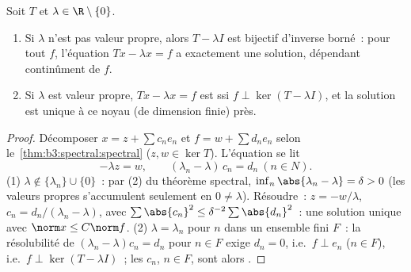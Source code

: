 \begin{theorem}
\label{thm:b3:spectral:fredholm}
Soit $T$   et $\lambda \in \R\setminus
\{0\}$.
\begin{enumerate}
  \item Si $\lambda$ n'est pas valeur propre, alors $T -
        \lambda I$ est bijectif d'inverse borné~: pour tout
        $f$, l'équation $Tx - \lambda x = f$ a exactement une
        solution, dépendant continûment de $f$.
  \item Si $\lambda$ est valeur propre, $Tx - \lambda x = f$
        est  ssi $f \perp \ker(T - \lambda I)$, et
        la solution est unique à ce noyau (de dimension
        finie) près.
\end{enumerate}
\end{theorem}

\begin{proof}
Décomposer $x = z + \sum c_ne_n$ et $f = w + \sum d_ne_n$
selon le~\cref{thm:b3:spectral:spectral} ($z, w \in \ker T$).
L'équation se lit
\[
-\lambda z = w, \qquad (\lambda_n - \lambda)\,c_n = d_n\
(n \in N).
\]
(1) $\lambda \notin \{\lambda_n\}\cup\{0\}$~: par (2) du
théorème spectral, $\inf_n\abs{\lambda_n - \lambda} = \delta
> 0$ (les valeurs propres s'accumulent seulement en $0 \neq
\lambda$). Résoudre~: $z = -w/\lambda$, $c_n =
d_n/(\lambda_n - \lambda)$, avec $\sum\abs{c_n}^2 \leq
\delta^{-2}\sum\abs{d_n}^2$~: une solution unique avec $\norm
x \leq C\norm f$.
(2) $\lambda = \lambda_{n}$ pour $n$ dans un ensemble fini
$F$~: la résolubilité de $(\lambda_n - \lambda)c_n = d_n$
pour $n \in F$ exige $d_n = 0$, i.e.\ $f \perp e_n$ ($n \in
F$), i.e.\ $f \perp \ker(T - \lambda I)$~; les $c_n$, $n
\in F$, sont alors .
\end{proof}

